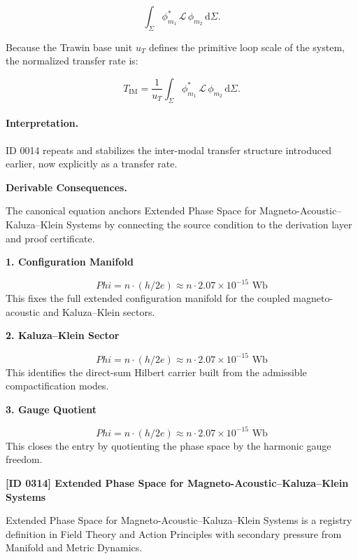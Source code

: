 \begin{equation}
\int_{\Sigma}
\phi_{m_1}^{*}
\,\mathcal{L}\,
\phi_{m_2}
\,\mathrm{d}\Sigma .
\end{equation}

Because the Trawin base unit $u_T$ defines the primitive loop scale of the system, the normalized transfer rate is:

\begin{equation}
\boxed{
T_{\mathrm{IM}}
=
\frac{1}{u_T}
\int_{\Sigma}
\phi_{m_1}^{*}
\,\mathcal{L}\,
\phi_{m_2}
\,\mathrm{d}\Sigma .
}
\end{equation}

\paragraph{Interpretation.}
ID 0014 repeats and stabilizes the inter-modal transfer structure introduced earlier, now explicitly as a transfer rate.

\par\vspace{0.35em}
\noindent\textbf{Derivable Consequences.}\quad
\begingroup
\footnotesize
\raggedright
The canonical equation anchors Extended Phase Space for Magneto-Acoustic--Kaluza--Klein Systems by connecting the source condition to the derivation layer and proof certificate.
\par\endgroup

\noindent\textbf{1. Configuration Manifold}\par
\[
Phi = n \cdot (h/2e) \approx n \cdot 2.07 \times 10^{-15} \text{ Wb}
\]
\noindent This fixes the full extended configuration manifold for the coupled magneto-acoustic and Kaluza--Klein sectors.\par
\noindent\textbf{2. Kaluza--Klein Sector}\par
\[
Phi = n \cdot (h/2e) \approx n \cdot 2.07 \times 10^{-15} \text{ Wb}
\]
\noindent This identifies the direct-sum Hilbert carrier built from the admissible compactification modes.\par
\noindent\textbf{3. Gauge Quotient}\par
\[
Phi = n \cdot (h/2e) \approx n \cdot 2.07 \times 10^{-15} \text{ Wb}
\]
\noindent This closes the entry by quotienting the phase space by the harmonic gauge freedom.\par

\clearpage
\noindent\textbf{[ID 0314] Extended Phase Space for Magneto-Acoustic--Kaluza--Klein Systems}\par
\vspace{0.35em}
\begingroup\small
{}
Extended Phase Space for Magneto-Acoustic--Kaluza--Klein Systems is a registry definition in Field Theory and Action Principles with secondary pressure from Manifold and Metric Dynamics.

